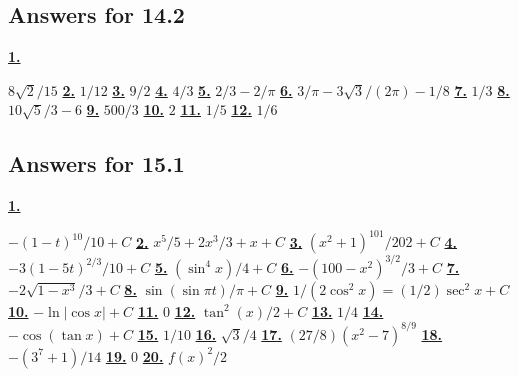 \subsection *{Answers for 14.2}
\hypertarget {a:14.2.1}{\hyperlink {e:14.2.1}{\bfseries 1.}} \mdseries $8\sqrt 2/15$\qquad 
\hypertarget {a:14.2.2}{\hyperlink {e:14.2.2}{\bfseries 2.}} \mdseries $1/12$\qquad 
\hypertarget {a:14.2.3}{\hyperlink {e:14.2.3}{\bfseries 3.}} \mdseries $9/2$\qquad 
\hypertarget {a:14.2.4}{\hyperlink {e:14.2.4}{\bfseries 4.}} \mdseries $4/3$\qquad 
\hypertarget {a:14.2.5}{\hyperlink {e:14.2.5}{\bfseries 5.}} \mdseries $2/3-2/\pi $\qquad 
\hypertarget {a:14.2.6}{\hyperlink {e:14.2.6}{\bfseries 6.}} \mdseries $3/\pi - 3\sqrt 3/(2\pi )-1/8$\qquad 
\hypertarget {a:14.2.7}{\hyperlink {e:14.2.7}{\bfseries 7.}} \mdseries $1/3$\qquad 
\hypertarget {a:14.2.8}{\hyperlink {e:14.2.8}{\bfseries 8.}} \mdseries $10\sqrt {5}/3-6$\qquad 
\hypertarget {a:14.2.9}{\hyperlink {e:14.2.9}{\bfseries 9.}} \mdseries $500/3$\qquad 
\hypertarget {a:14.2.10}{\hyperlink {e:14.2.10}{\bfseries 10.}} \mdseries $2$\qquad 
\hypertarget {a:14.2.11}{\hyperlink {e:14.2.11}{\bfseries 11.}} \mdseries $1/5$\qquad 
\hypertarget {a:14.2.12}{\hyperlink {e:14.2.12}{\bfseries 12.}} \mdseries $1/6$\qquad 
\subsection *{Answers for 15.1}
\hypertarget {a:15.1.1}{\hyperlink {e:15.1.1}{\bfseries 1.}} \mdseries $-(1-t)^{10}/10+C$\qquad 
\hypertarget {a:15.1.2}{\hyperlink {e:15.1.2}{\bfseries 2.}} \mdseries $x^5/5+2x^3/3+x+C$\qquad 
\hypertarget {a:15.1.3}{\hyperlink {e:15.1.3}{\bfseries 3.}} \mdseries $(x^2+1)^{101}/202+C$\qquad 
\hypertarget {a:15.1.4}{\hyperlink {e:15.1.4}{\bfseries 4.}} \mdseries $-3(1-5t)^{2/3}/10+C$\qquad 
\hypertarget {a:15.1.5}{\hyperlink {e:15.1.5}{\bfseries 5.}} \mdseries $(\sin ^4x)/4+C$\qquad 
\hypertarget {a:15.1.6}{\hyperlink {e:15.1.6}{\bfseries 6.}} \mdseries $-(100-x^2)^{3/2}/3+C$\qquad 
\hypertarget {a:15.1.7}{\hyperlink {e:15.1.7}{\bfseries 7.}} \mdseries $-2\sqrt {1-x^3}/3+C$\qquad 
\hypertarget {a:15.1.8}{\hyperlink {e:15.1.8}{\bfseries 8.}} \mdseries $\sin (\sin \pi t)/\pi +C$\qquad 
\hypertarget {a:15.1.9}{\hyperlink {e:15.1.9}{\bfseries 9.}} \mdseries $1/(2\cos ^2 x)=(1/2)\sec ^2x+C$\qquad 
\hypertarget {a:15.1.10}{\hyperlink {e:15.1.10}{\bfseries 10.}} \mdseries $-\ln |\cos x|+C$\qquad 
\hypertarget {a:15.1.11}{\hyperlink {e:15.1.11}{\bfseries 11.}} \mdseries $0$\qquad 
\hypertarget {a:15.1.12}{\hyperlink {e:15.1.12}{\bfseries 12.}} \mdseries $\tan ^2(x)/2+C$\qquad 
\hypertarget {a:15.1.13}{\hyperlink {e:15.1.13}{\bfseries 13.}} \mdseries $1/4$\qquad 
\hypertarget {a:15.1.14}{\hyperlink {e:15.1.14}{\bfseries 14.}} \mdseries $-\cos (\tan x)+C$\qquad 
\hypertarget {a:15.1.15}{\hyperlink {e:15.1.15}{\bfseries 15.}} \mdseries $1/10$\qquad 
\hypertarget {a:15.1.16}{\hyperlink {e:15.1.16}{\bfseries 16.}} \mdseries $\sqrt 3/4$\qquad 
\hypertarget {a:15.1.17}{\hyperlink {e:15.1.17}{\bfseries 17.}} \mdseries $(27/8)(x^2-7)^{8/9}$\qquad 
\hypertarget {a:15.1.18}{\hyperlink {e:15.1.18}{\bfseries 18.}} \mdseries $-(3^7+1)/14$\qquad 
\hypertarget {a:15.1.19}{\hyperlink {e:15.1.19}{\bfseries 19.}} \mdseries $0$\qquad 
\hypertarget {a:15.1.20}{\hyperlink {e:15.1.20}{\bfseries 20.}} \mdseries $f(x)^2/2$\qquad 
